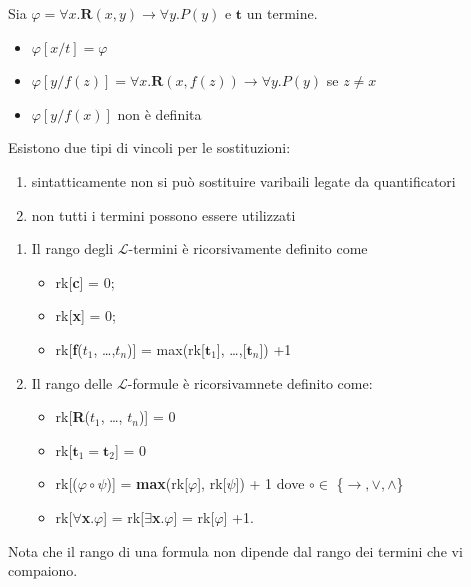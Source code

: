 \documentclass[a4paper, 12pt]{book}
\newcommand{\definizione}[2]{%
\vspace{15pt}%
\begin{tcolorbox}[
  colback=cyan!5!white,
  colframe=blue!50!black,
  title=\textbf{Definizione: #1}, %
  coltitle=white,
  fonttitle=\bfseries,
  arc=3mm,
  boxrule=0.5pt,
  enhanced,
  breakable
]
#2 %
\end{tcolorbox}
\vspace{15pt}%
}
\newcommand{\esempio}[2]{%
  \begin{center}
    \textbf{#1}\par
    #2
  \end{center}
}
\begin{document}
\esempio{}{
  Sia $\varphi = \forall x.\mathbf{R}(x,y) \rightarrow \forall y.P(y)$ e $\mathbf{t}$ un termine.
  \begin{itemize}
    \item $\varphi[x/t] = \varphi$
    \item $\varphi[y/f(z)] = \forall x.\mathbf{R}(x,f(z)) \rightarrow \forall y.P(y)$ se $z \neq x$
    \item $\varphi[y/f(x)]$ non è definita
  \end{itemize}
}


Esistono due tipi di vincoli per le sostituzioni:
\begin{enumerate}
  \item sintatticamente non si può sostituire varibaili legate da quantificatori
  \item non tutti i termini possono essere utilizzati
\end{enumerate}


\definizione{Rango}{
  \begin{enumerate}
    \item Il rango degli $\mathcal{L}$-termini è ricorsivamente definito come 
      \begin{itemize}
        \item rk[\textbf{c}] = 0;
        \item rk[\textbf{x}] = 0;
        \item rk[\textbf{f}($t_1$, \dots ,$t_n$)] = max(rk[$\textbf{t}_1$], \dots ,[$\textbf{t}_n$]) +1
    \end{itemize}
    \item Il rango delle $\mathcal{L}$-formule è ricorsivamnete definito come:
    \begin{itemize}
      \item rk[\textbf{R}($t_1$, \dots, $t_n$)] = 0
      \item rk[$\textbf{t}_1 = \textbf{t}_2$] = 0
      \item rk[($\varphi \circ \psi$)] = \textbf{max}(rk[$\varphi$], rk[$\psi$]) + 1 dove $\circ \in$ \{$\rightarrow, \lor, \land$\}
      \item rk[$\forall$\textbf{x}.$\varphi$] = rk[$\exists $\textbf{x}.$\varphi$] = rk[$\varphi$] +1.
    \end{itemize}
  \end{enumerate}
  Nota che il rango di una formula non dipende dal rango dei termini che vi compaiono.
}
\end{document}
